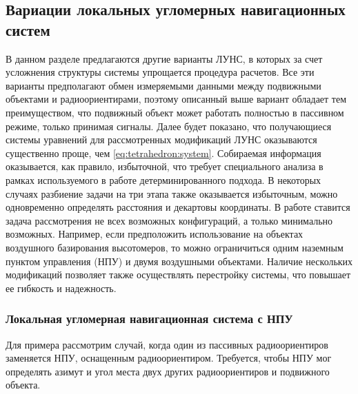 \documentclass[../main.tex]{subfiles}
\begin{document}
%
%
\subsection{Вариации локальных угломерных навигационных систем}
В данном разделе предлагаются другие варианты ЛУНС, в которых за счет усложнения структуры системы упрощается процедура расчетов. Все эти варианты предполагают обмен измеряемыми данными между подвижными объектами и радиоориентирами, поэтому описанный выше вариант обладает тем преимуществом, что подвижный объект может работать полностью в пассивном режиме, только принимая сигналы. Далее будет показано, что получающиеся системы уравнений для рассмотренных модификаций ЛУНС оказываются существенно проще, чем \eqref{eq:tetrahedron:system}. Собираемая информация оказывается, как правило, избыточной, что требует специального анализа в рамках используемого в работе детерминированного подхода. В некоторых случаях разбиение задачи на три этапа также оказывается избыточным, можно одновременно определять расстояния и декартовы координаты. В работе ставится задача рассмотрения не всех возможных конфигураций, а только минимально возможных. Например, если предположить использование на объектах воздушного базирования высотомеров, то можно ограничиться одним наземным пунктом управления (НПУ) и двумя воздушными объектами. Наличие нескольких модификаций позволяет также осуществлять перестройку системы, что повышает ее гибкость и надежность.

\subsubsection{Локальная угломерная навигационная система с НПУ}
Для примера рассмотрим случай, когда один из пассивных радиоориентиров заменяется НПУ, оснащенным радиоориентиром. Требуется, чтобы НПУ мог определять азимут и угол места двух других радиоориентиров и подвижного объекта.
\end{document}

